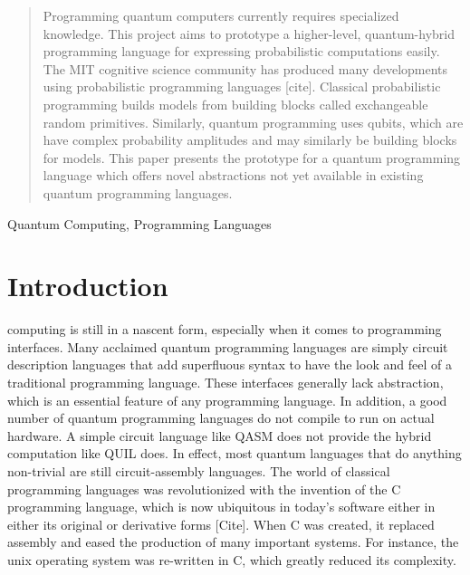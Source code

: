 \documentclass[journal]{IEEEtran}
\begin{document}


\maketitle

\begin{abstract}
    Programming quantum computers currently requires specialized knowledge. 
    This project aims to prototype a higher-level, quantum-hybrid programming language for expressing probabilistic computations easily.
    The MIT cognitive science community has produced many developments using probabilistic programming languages [cite]. 
    Classical probabilistic programming builds models from building blocks called exchangeable random primitives. 
    Similarly, quantum programming uses qubits, which are have complex probability amplitudes and may similarly be building blocks for models.
    This paper presents the prototype for a quantum programming language which offers novel abstractions not yet available in existing quantum programming languages.
\end{abstract}

\begin{IEEEkeywords}
    Quantum Computing, Programming Languages
\end{IEEEkeywords}

\IEEEpeerreviewmaketitle

\section{Introduction}
 computing is still in a nascent form, especially when it comes to programming interfaces. 
Many acclaimed quantum programming languages are simply circuit description languages that add superfluous syntax to have the look and feel of a traditional programming language.
These interfaces generally lack abstraction, which is an essential feature of any programming language.
In addition, a good number of quantum programming languages do not compile to run on actual hardware.
A simple circuit language like QASM does not provide the hybrid computation like QUIL does.
In effect, most quantum languages that do anything non-trivial are still circuit-assembly languages.
The world of classical programming languages was revolutionized with the invention of the C programming language, which is now ubiquitous in today's software either in either its original or derivative forms [Cite]. 
When C was created, it replaced assembly and eased the production of many important systems.
For instance, the unix operating system was re-written in C, which greatly reduced its complexity.
\end{document}

